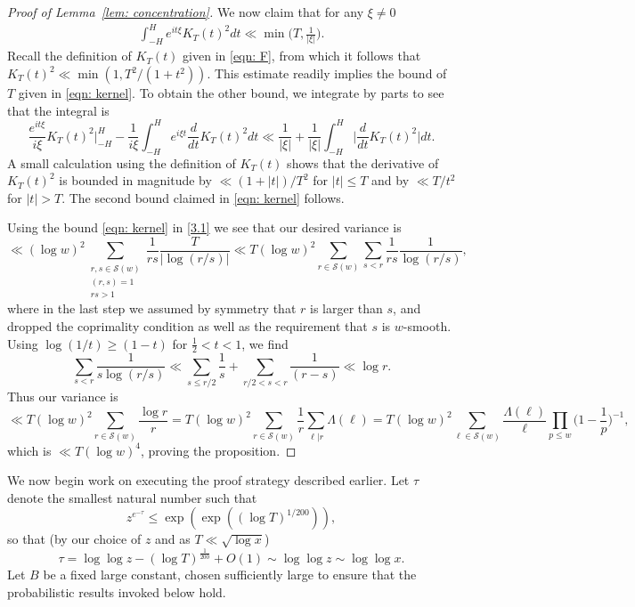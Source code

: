 \documentclass[12pt, notitlepage]{amsart}
\numberwithin{equation}{section}
\theoremstyle{remark}
\theoremstyle{definition}
\theoremstyle{remark}
\numberwithin{equation}{section}
\begin{document}
\begin{proof}[Proof of Lemma~\ref{lem: concentration}]
We now claim that for any $\xi \neq 0$ 
 \begin{equation}\label{eqn: kernel}
        \begin{split}
    \int_{-H}^{H} e^{it\xi}  K_T(t)^{2} dt 
     \ll \min \Big( T, \frac{1}{|\xi|} \Big) . 
        \end{split}
    \end{equation}
 Recall the definition of $K_T(t)$ given in \eqref{eqn: F},  from which it follows that $K_T(t)^2 \ll \min(1, T^2/(1+t^2))$.  This estimate readily implies the bound of $T$ given in \eqref{eqn: kernel}.    To obtain the other bound, we integrate by parts to see that the integral is 
 $$
 \frac{e^{it\xi}}{i\xi} K_T(t)^2 \Big|_{-H}^{H} - \frac{1}{i\xi} \int_{-H}^{H} e^{i\xi t}\frac{d}{dt} K_T(t)^2  dt \ll 
 \frac{1}{|\xi|} + \frac{1}{|\xi|} \int_{-H}^{H} \Big| \frac{d}{dt} K_T(t)^2 \Big| dt. 
 $$ 
A small calculation using the definition of $K_T(t)$ shows that the derivative of $K_T(t)^2$ is bounded in magnitude by $\ll (1+|t|)/T^2$ for $|t| \le T$ and by $\ll T/t^2$ for $|t| >T$.  The second bound claimed in \eqref{eqn: kernel} follows.  
    
 Using the bound \eqref{eqn: kernel} in \eqref{3.1} we see that our desired  variance is 
 $$ 
 \ll   (\log w)^2 \sum_{\substack{ r, s\in {\mathcal S}(w) \\ (r,s)=1 \\ rs >1}} \frac{1}{rs} \frac{T}{|\log (r/s)|} \ll T (\log w)^2 \sum_{r \in {\mathcal S}(w)} \sum_{s<r} \frac{1}{rs} \frac{1}{\log (r/s)}, 
 $$ 
 where in the last step we assumed by symmetry that $r$ is larger than $s$, and dropped the coprimality condition as well as the requirement that $s$ is $w$-smooth.    Using $\log (1/t) \ge (1-t)$ for $\tfrac 12 <t <1$, we find  
 $$ 
 \sum_{s<r} \frac{1}{s\log (r/s)} \ll \sum_{s\le r/2} \frac 1s + \sum_{r/2 < s <r} \frac{1}{(r-s)} \ll \log r.  
 $$
 Thus our variance is 
 $$ 
 \ll T(\log w)^2 \sum_{r\in {\mathcal S}(w)} \frac{\log r}{r} = T(\log w)^2 \sum_{r\in {\mathcal S}(w)} \frac{1}{r} \sum_{\ell |r} \Lambda(\ell) 
 = T (\log w)^2 \sum_{\ell \in {\mathcal S}(w)} \frac{\Lambda(\ell)}{\ell} \prod_{p\le w} \Big(1-\frac 1p\Big)^{-1}, 
 $$ 
which is $\ll T(\log w)^4$,  proving the proposition.  
 \end{proof}


\vspace{12pt}

We now begin work on executing the proof strategy described earlier.   Let $\tau$ denote the smallest natural number such that 
$$ 
z^{e^{-\tau}} \le \exp( \exp( (\log T)^{1/200})), 
$$ 
so that (by our choice of $z$ and as $T \ll \sqrt{\log x}$) 
$$
\tau = \log \log z - (\log T)^{\frac{1}{200}} +O(1) \sim \log \log z \sim \log \log x. 
$$ 
 Let $B$ be a fixed large constant, chosen sufficiently large to ensure that the probabilistic results invoked below hold.
 
\end{document}
